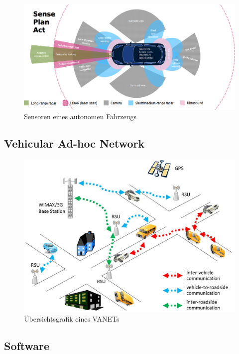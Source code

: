 \begin{figure}[H]
    \centering
    \includegraphics[width=.485\textwidth]{resources/images/sensors.png}
    \caption{Sensoren eines autonomen Fahrzeugs \cite{smith2015automated}}
\end{figure}



\subsection{Vehicular Ad-hoc Network}

\begin{figure}[H]
    \centering
    \includegraphics[width=.485\textwidth]{resources/images/vanet.jpg}
    \caption{Übersichtsgrafik eines VANETs \cite{vanet}}
\end{figure}

\subsection{Software}
